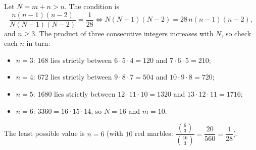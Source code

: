 Let $N=m+n>n$. The condition is
\[\dfrac{n(n-1)(n-2)}{N(N-1)(N-2)}=\dfrac1{28}\iff N(N-1)(N-2)=28\,n(n-1)(n-2),\]
and $n\ge3$. The product of three consecutive integers increases with $N$, so check each $n$ in turn:
\begin{itemize}
\item $n=3$: $168$ lies strictly between $6\cdot5\cdot4=120$ and $7\cdot6\cdot5=210$;
\item $n=4$: $672$ lies strictly between $9\cdot8\cdot7=504$ and $10\cdot9\cdot8=720$;
\item $n=5$: $1680$ lies strictly between $12\cdot11\cdot10=1320$ and $13\cdot12\cdot11=1716$;
\item $n=6$: $3360=16\cdot15\cdot14$, so $N=16$ and $m=10$.
\end{itemize}
The least possible value is $n=\boxed{6}$ (with $10$ red marbles: $\dfrac{\binom63}{\binom{16}3}=\dfrac{20}{560}=\dfrac1{28}$).
